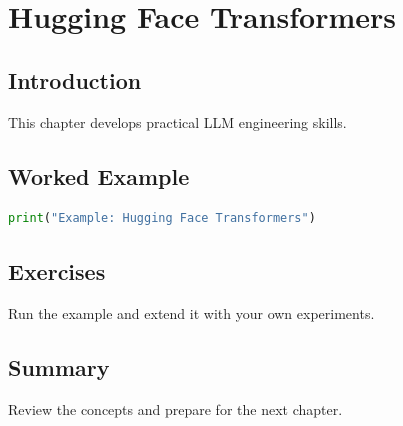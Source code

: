 \chapter{Hugging Face Transformers}
\label{chap:vol9-8}



\section{Introduction}
This chapter develops practical LLM engineering skills.

\section{Worked Example}
\begin{lstlisting}[language=Python]
print("Example: Hugging Face Transformers")
\end{lstlisting}

\section{Exercises}
\begin{exercise}
Run the example and extend it with your own experiments.
\end{exercise}

\section{Summary}
Review the concepts and prepare for the next chapter.

